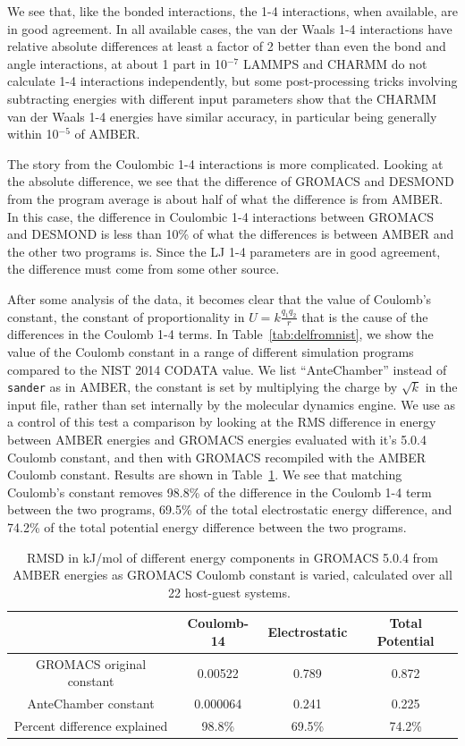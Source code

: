 We see that, like the bonded interactions, the 1-4 interactions, when
available, are in good agreement.  In all available cases, the van der
Waals 1-4 interactions have relative absolute differences at least a
factor of 2 better than even the bond and angle interactions, at about
1 part in 10$^{-7}$ LAMMPS and CHARMM do not calculate 1-4
interactions independently, but some post-processing tricks involving
subtracting energies with different input parameters show that the
CHARMM van der Waals 1-4 energies have similar accuracy, in particular
being generally within 10$^{-5}$ of AMBER.  

The story from the Coulombic 1-4 interactions is more
complicated. Looking at the absolute difference, we see that the
difference of GROMACS and DESMOND from the program average is about
half of what the difference is from AMBER. In this case, the
difference in Coulombic 1-4 interactions between GROMACS and DESMOND
is less than 10\% of what the differences is between AMBER and the
other two programs is.  Since the LJ 1-4 parameters are in good
agreement, the difference must come from some other source.

After some analysis of the data, it becomes clear that the value of
Coulomb's constant, the constant of proportionality in $U =
k\frac{q_1q_2}{r}$ that is the cause of the differences in the Coulomb
1-4 terms. In Table~\ref{tab:delfromnist}, we show the value of the
Coulomb constant in a range of different simulation programs compared
to the NIST 2014 CODATA value. We list ``AnteChamber'' instead of {\tt
  sander} as in AMBER, the constant is set by multiplying the charge
by $\sqrt{k}$ in the input file, rather than set internally by the
molecular dynamics engine.  We use as a control of this test a
comparison by looking at the RMS difference in energy between AMBER
energies and GROMACS energies evaluated with it's 5.0.4 Coulomb
constant, and then with GROMACS recompiled with the AMBER Coulomb
constant.  Results are shown in Table~\ref{table:coulchange}. We see
that matching Coulomb's constant removes 98.8\% of the difference in
the Coulomb 1-4 term between the two programs, 69.5\% of the total
electrostatic energy difference, and 74.2\% of the total potential
energy difference between the two programs.

\begin{table}
\caption{RMSD in kJ/mol of different energy components in GROMACS
  5.0.4 from AMBER energies as GROMACS Coulomb constant is varied,
  calculated over all 22 host-guest systems.~\label{table:coulchange}}
\begin{tabular}{|c|ccc|}
\hline
                          & Coulomb-14  & Electrostatic & Total Potential \\
\hline
GROMACS original constant &  0.00522    & 0.789         & 0.872  \\ 
AnteChamber constant      &  0.000064   & 0.241         & 0.225 \\
Percent difference explained & 98.8\%   & 69.5\%        & 74.2\% \\  
\hline
\end{tabular}
\end{table}

